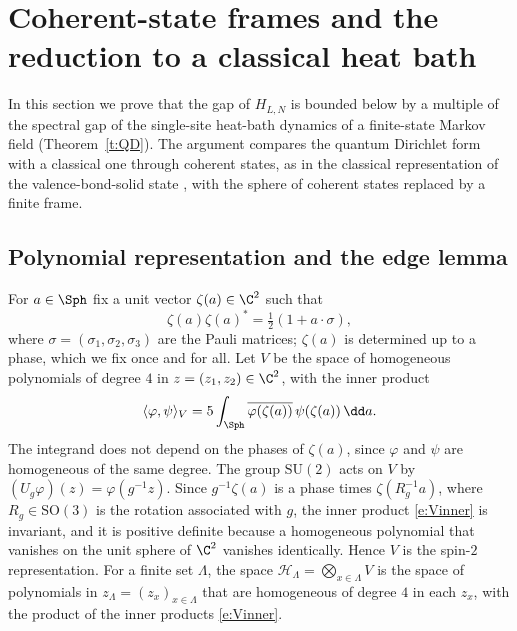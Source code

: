 \section{Coherent-state frames and the reduction to a classical heat bath}\label{s:frames}

In this section we prove that the gap of $H_{L, N}$ is bounded below by a multiple of the spectral gap of the single-site heat-bath dynamics of a finite-state Markov field (Theorem~\ref{t:QD}). The argument compares the quantum Dirichlet form with a classical one through coherent states, as in the classical representation of the valence-bond-solid state \cite{AKLT88, KLT88}, with the sphere of coherent states replaced by a finite frame.

\subsection{Polynomial representation and the edge lemma}\label{s:poly}

For $a \in \Sph$ fix a unit vector $\zeta(a) \in \C^2$ such that
\begin{equation}\label{e:zeta}
\zeta(a) \zeta(a)^* = \tfrac12 (1 + a \cdot \sigma),
\end{equation}
where $\sigma = (\sigma_1, \sigma_2, \sigma_3)$ are the Pauli matrices; $\zeta(a)$ is determined up to a phase, which we fix once and for all. Let $V$ be the space of homogeneous polynomials of degree $4$ in $z = (z_1, z_2) \in \C^2$, with the inner product
\begin{equation}\label{e:Vinner}
\langle \varphi, \psi \rangle_V = 5 \int_{\Sph} \overline{\varphi(\zeta(a))} \, \psi(\zeta(a)) \, \dd a .
\end{equation}
The integrand does not depend on the phases of $\zeta(a)$, since $\varphi$ and $\psi$ are homogeneous of the same degree. The group $\mathrm{SU}(2)$ acts on $V$ by $(U_g \varphi)(z) = \varphi(g^{-1} z)$. Since $g^{-1} \zeta(a)$ is a phase times $\zeta(R_g^{-1} a)$, where $R_g \in \mathrm{SO}(3)$ is the rotation associated with $g$, the inner product \eqref{e:Vinner} is invariant, and it is positive definite because a homogeneous polynomial that vanishes on the unit sphere of $\C^2$ vanishes identically. Hence $V$ is the spin-$2$ representation. For a finite set $\Lambda$, the space $\mathcal H_\Lambda = \bigotimes_{x \in \Lambda} V$ is the space of polynomials in $z_\Lambda = (z_x)_{x \in \Lambda}$ that are homogeneous of degree $4$ in each $z_x$, with the product of the inner products \eqref{e:Vinner}.

